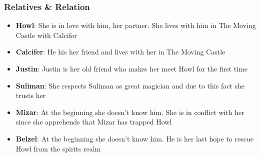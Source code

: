 




\subsubsection*{Relatives \& Relation}
\begin{itemize}
\item \textbf{Howl}: She is in love with him, her partner. She lives with him in The Moving Castle with Calcifer
\item \textbf{Calcifer}: He his her friend and lives with her in The Moving Castle
\item \textbf{Justin}: Justin is her old friend who makes her meet Howl for the first time
\item \textbf{Suliman}: She respects Suliman as great magician and due to this fact she trusts her
\item \textbf{Mizar}: At the beginning she doesn’t know him. She is in conflict with her since she 
apprehends that Mizar has trapped Howl
\item \textbf{Belzel}: At the beginning she doesn’t know him. He is her last hope to rescue Howl from the spirits realm
\end{itemize}

